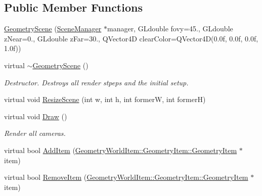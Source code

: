 \subsection*{Public Member Functions}
\begin{DoxyCompactItemize}
\item 
\mbox{\hyperlink{class_geometry_engine_1_1_geometry_scene_1_1_geometry_scene_a238916b6237ec6b280541e48604955ca}{Geometry\+Scene}} (\mbox{\hyperlink{class_geometry_engine_1_1_scene_manager}{Scene\+Manager}} $\ast$manager, G\+Ldouble fovy=45., G\+Ldouble z\+Near=0., G\+Ldouble z\+Far=30., Q\+Vector4D clear\+Color=Q\+Vector4D(0.\+0f, 0.\+0f, 0.\+0f, 1.\+0f))
\item 
\mbox{\label{class_geometry_engine_1_1_geometry_scene_1_1_geometry_scene_af05de8d5682efff50740fa5832b2c933}} 
virtual \mbox{\hyperlink{class_geometry_engine_1_1_geometry_scene_1_1_geometry_scene_af05de8d5682efff50740fa5832b2c933}{$\sim$\+Geometry\+Scene}} ()
\begin{DoxyCompactList}\small\item\em Destructor. Destroys all render stpeps and the initial setup. \end{DoxyCompactList}\item 
virtual void \mbox{\hyperlink{class_geometry_engine_1_1_geometry_scene_1_1_geometry_scene_ad4bc76248a37e0a16edff30fe52a29cc}{Resize\+Scene}} (int w, int h, int formerW, int formerH)
\item 
\mbox{\label{class_geometry_engine_1_1_geometry_scene_1_1_geometry_scene_a821c704ac76da8c4a590238a924e1f34}} 
virtual void \mbox{\hyperlink{class_geometry_engine_1_1_geometry_scene_1_1_geometry_scene_a821c704ac76da8c4a590238a924e1f34}{Draw}} ()
\begin{DoxyCompactList}\small\item\em Render all cameras. \end{DoxyCompactList}\item 
virtual bool \mbox{\hyperlink{class_geometry_engine_1_1_geometry_scene_1_1_geometry_scene_a31a1d878b18e5e9fe4cc4aebeb3de415}{Add\+Item}} (\mbox{\hyperlink{class_geometry_engine_1_1_geometry_world_item_1_1_geometry_item_1_1_geometry_item}{Geometry\+World\+Item\+::\+Geometry\+Item\+::\+Geometry\+Item}} $\ast$item)
\item 
virtual bool \mbox{\hyperlink{class_geometry_engine_1_1_geometry_scene_1_1_geometry_scene_afc7294415ed5013f22c4c8e587437019}{Remove\+Item}} (\mbox{\hyperlink{class_geometry_engine_1_1_geometry_world_item_1_1_geometry_item_1_1_geometry_item}{Geometry\+World\+Item\+::\+Geometry\+Item\+::\+Geometry\+Item}} $\ast$item)

\end{DoxyCompactItemize}
